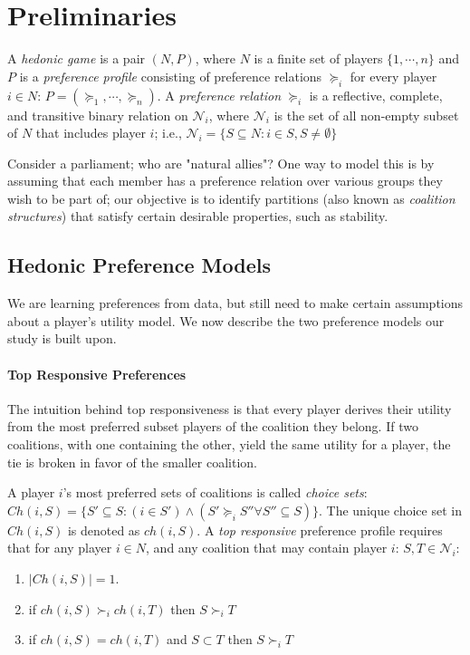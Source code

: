 \documentclass[letterpaper]{article} %
\newcommand{\Ch}{\mathit{Ch}}
\newcommand{\ch}{\mathit{ch}}
\theoremstyle{definition}
\begin{document}
\section{Preliminaries}\label{sec:prelim}
A {\it hedonic game} is a pair $(N, P)$, where $N$ is a finite set of players $\{1, \cdots, n\}$ and $P$ is a {\it preference profile} consisting of preference relations $\succeq_i$ for every player $i \in N$: $P = (\succeq_1, \cdots, \succeq_n)$. A {\it preference relation} $\succeq_i$ is a reflective, complete, and transitive binary relation on $\mathcal{N}_i$, where $\mathcal{N}_i$ is the set of all non-empty subset of $N$ that includes player $i$; i.e., $\mathcal{N}_i = \{S \subseteq N: i \in S, S \neq \emptyset \}$

Consider a parliament; who are "natural allies"? One way to model this is by assuming that each member has a preference relation over various groups they wish to be part of; our objective is to identify partitions (also known as {\it coalition structures}) that satisfy certain desirable properties, such as stability.

\subsection{Hedonic Preference Models}
We are learning preferences from data, but still need to make certain assumptions about a player's utility model. We now describe the two preference models our study is built upon.

\paragraph{Top Responsive Preferences}
The intuition behind top responsiveness is that every player derives their utility from the most preferred subset players of the coalition they belong. If two coalitions, with one containing the other, yield the same utility for a player, the tie is broken in favor of the smaller coalition. 

A player $i$'s most preferred sets of coalitions is called {\it choice sets}: $\Ch(i, S) = \{S' \subseteq S: (i \in S') \wedge (S' \succeq_i S'' \forall S'' \subseteq S)\}$. The unique choice set in $\Ch(i, S)$ is denoted as $\ch(i, S)$. A {\em top responsive} preference profile requires that for any player $i \in N$, and any coalition that may contain player $i$: $S, T \in \mathcal{N}_i$:
\begin{enumerate}
  \item $|\Ch(i, S)| = 1$.
  \item if $\ch(i, S) \succ_i \ch(i, T)$ then $S \succ_i T$
  \item if $\ch(i, S) = \ch(i, T)$ and $S \subset T$ then $S \succ_i T$
\end{enumerate}
\end{document}
